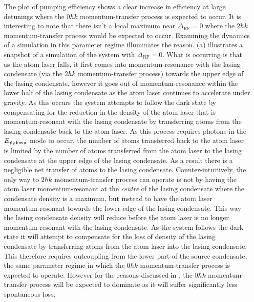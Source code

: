 The plot of pumping efficiency  shows a clear increase in efficiency at large detunings where the $0 \hbar k$ momentum-transfer process is expected to occur.  It is interesting to note that there isn't a local maximum near $\Delta_\text{RF} = 0$ where the $2 \hbar k$ momentum-transfer process would be expected to occur.  Examining the dynamics of a simulation in this parameter regime illuminates the reason.  (a) illustrates a snapshot of a simulation of the system with $\Delta_\text{RF}= 0$.  What is occurring is that as the atom laser falls, it first comes into momentum-resonance with the lasing condensate (via the $2 \hbar k$ momentum-transfer process) towards the upper edge of the lasing condensate, however it goes out of momentum-resonance within the lower half of the lasing condensate as the atom laser continues to accelerate under gravity.  As this occurs the system attempts to follow the dark state by compensating for the reduction in the density of the atom laser that is momentum-resonant with the lasing condensate by transferring atoms from the lasing condensate back to the atom laser.  As this process requires photons in the $E_{\slashed{\pi}, \text{down}}$ mode to occur, the number of atoms transferred back to the atom laser is limited by the number of atoms transferred from the atom laser to the lasing condensate at the upper edge of the lasing condensate.  As a result there is a negligible net transfer of atoms to the lasing condensate.  Counter-intuitively, the only way to $2 \hbar k$ momentum-transfer process can operate is not by having the atom laser momentum-resonant at the \emph{centre} of the lasing condensate where the condensate density is a maximum, but instead to have the atom laser momentum-resonant towards the lower edge of the lasing condensate.  This way the lasing condensate density will reduce before the atom laser is no longer momentum-resonant with the lasing condensate.  As the system follows the dark state it will attempt to compensate for the loss of density of the lasing condensate by transferring atoms from the atom laser into the lasing condensate.  This therefore requires outcoupling from the lower part of the source condensate, the same parameter regime in which the $0 \hbar k$ momentum-transfer process is expected to operate.  However for the reasons discussed in , the $0 \hbar k$ momentum-transfer process will be expected to dominate as it will suffer significantly less spontaneous loss.

